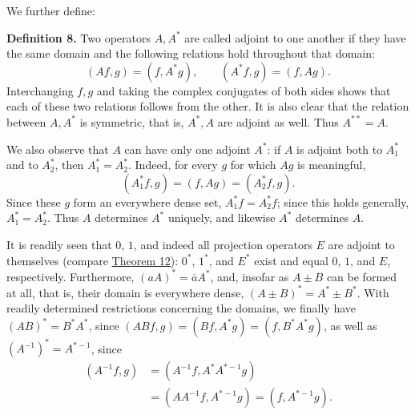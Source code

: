 \documentclass[fontsize=13pt,twoside,openany,headings=normal,parskip=false,bookmarkpackage=false,DIV=calc]{scrbook}
\begin{document}
We further define:

\leavevmode{}\textbf{Definition 8.}\label{def:II.8} Two operators $A,A^*$ are called adjoint to one another if they have the same domain and the following relations hold throughout that domain:
\[
(Af,g)=(f,A^*g),\qquad(A^*f,g)=(f,Ag).
\]
Interchanging $f,g$ and taking the complex conjugates of both sides shows that each of these two relations follows from the other. It is also clear that the relation between $A,A^*$ is symmetric, that is, $A^*,A$ are adjoint as well. Thus $A^{**}=A$.

We also observe that $A$ can have only one adjoint $A^*$: if $A$ is adjoint both to $A_1^*$ and to $A_2^*$, then $A_1^*=A_2^*$. Indeed, for every $g$ for which $Ag$ is meaningful,
\[
(A_1^*f,g)=(f,Ag)=(A_2^*f,g).
\]
Since these $g$ form an everywhere dense set, $A_1^*f=A_2^*f$; since this holds generally, $A_1^*=A_2^*$. Thus $A$ determines $A^*$ uniquely, and likewise $A^*$ determines $A$.

It is readily seen that $0$, $1$, and indeed all projection operators $E$ are adjoint to themselves (compare \hyperref[thm:II.12]{Theorem 12}): $0^*$, $1^*$, and $E^*$ exist and equal $0$, $1$, and $E$, respectively. Furthermore, $(aA)^*=\overline aA^*$, and, insofar as $A\pm B$ can be formed at all, that is, their domain is everywhere dense, $(A\pm B)^*=A^*\pm B^*$. With readily determined restrictions concerning the domains, we finally have $(AB)^*=B^*A^*$, since $(ABf,g)=(Bf,A^*g)=(f,B^*A^*g)$, as well as $(A^{-1})^*=A^{*-1}$, since
\begin{align*}
(A^{-1}f,g)&=(A^{-1}f,A^*A^{*-1}g)\\
&=(AA^{-1}f,A^{*-1}g)=(f,A^{*-1}g).
\end{align*}
\end{document}
